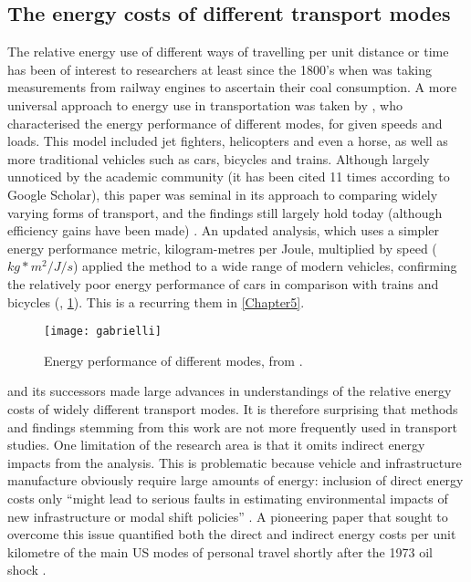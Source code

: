 \subsection{The energy costs of different transport modes}
The relative energy use of different ways of travelling per unit distance
or time has been of interest
to researchers at least since the 1800's when \citet{tredgold1835practical}
was taking measurements from railway engines to ascertain their coal
consumption. A more universal approach to energy use in transportation
was taken by \citet{Gabrielli1950}, who characterised the energy performance of
different modes, for given speeds and loads. This model included jet fighters,
helicopters and even a horse, as well as more traditional vehicles such as
cars, bicycles and trains. Although largely unnoticed by the academic
community (it has been cited 11 times according to Google Scholar), this
paper was seminal in its approach to comparing widely varying forms of
transport, and the findings still largely hold today (although efficiency
gains have been made) \citep{yong2005price}. An updated analysis, which uses
a simpler energy performance metric, kilogram-metres per Joule, multiplied
by speed ($kg*m^2/J/s$) applied the method
to a wide range of modern vehicles, confirming the relatively poor energy
performance of cars in comparison with trains and bicycles (\citealp{Radtke2008},
\cref{fgabrielli}). This is a recurring them in \cref{Chapter5}.

\begin{figure}[htbp]
  \centerline{
    \texttt{[image: gabrielli]}}
  \caption{Energy performance of different modes, from \citep{Radtke2008}.} %
  \label{fgabrielli}
\end{figure}

\citet{Gabrielli1950} and its successors made large advances in understandings
of the relative energy costs of widely different transport modes.
It is therefore surprising that methods and findings stemming from this
work are not more frequently used in transport studies.
One limitation of the research area is that it omits indirect energy impacts from
the analysis.
This is problematic because vehicle and infrastructure manufacture obviously
require large amounts of energy: inclusion of direct energy costs only
``might lead to serious faults in estimating environmental impacts of new
infrastructure or modal shift policies'' \citep[p.~23]{Wee2005}.
A pioneering paper that sought to overcome this issue quantified
both the direct and indirect
energy costs per unit kilometre of the main US modes of personal travel shortly
after the 1973 oil shock \citep{Fels1975}.

